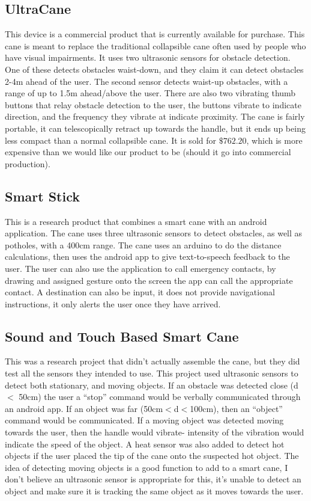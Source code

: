 \documentclass[letterpaper,12pt]{article}
\begin{document}
\subsection {UltraCane}

This device is a commercial product that is currently available for purchase. This cane is meant to replace the traditional collapsible cane often used by people who have visual impairments. It uses two ultrasonic sensors for obstacle detection. One of these detects obstacles waist-down, and they claim it can detect obstacles 2-4m ahead of the user. The second sensor detects waist-up obstacles, with a range of up to 1.5m ahead/above the user. There are also two vibrating thumb buttons that relay obstacle detection to the user, the buttons vibrate to indicate direction, and the frequency they vibrate at indicate proximity. The cane is fairly portable, it can telescopically retract up towards the handle, but it ends up being less compact than a normal collapsible cane. It is sold for $ \$762.20$, which is more expensive than we would like our product to be (should it go into commercial production). \cite{UltraCane}

\subsection {Smart Stick}

This is a research product that combines a smart cane with an android application. The cane uses three ultrasonic sensors to detect obstacles, as well as potholes, with a 400cm range. The cane uses an arduino to do the distance calculations, then uses the android app to give text-to-speech feedback to the user. The user can also use the application to call emergency contacts, by drawing and assigned gesture onto the screen the app can call the appropriate contact. A destination can also be input, it does not provide navigational instructions, it only alerts the user once they have arrived. \cite{SmartStick}

\subsection{Sound and Touch Based Smart Cane}

This was a research project that didn’t actually assemble the cane, but they did test all the sensors they intended to use. This project used ultrasonic sensors to detect both stationary, and moving objects. If an obstacle was detected close (d $<$ 50cm)  the user a “stop” command would be verbally communicated through an android app. If an object was far (50cm$<$d$<$100cm), then an “object” command would be communicated. If a moving object was detected moving towards the user, then the handle would vibrate- intensity of the vibration would indicate the speed of the object. A heat sensor was also added to detect hot objects if the user placed the tip of the cane onto the suspected hot object. The idea of detecting moving objects is a good function to add to a smart cane, I don’t believe an ultrasonic sensor is appropriate for this, it’s unable to detect an object and make sure it is tracking the same object as it moves towards the user. \cite{Sound}
\end{document}
